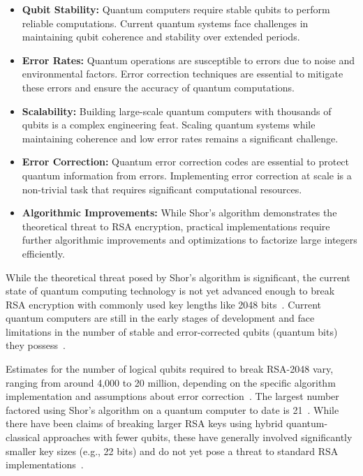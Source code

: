 \documentclass[12pt,a4paper]{report}
\begin{document}
\begin{itemize}
    \item \textbf{Qubit Stability:} Quantum computers require stable qubits to perform reliable computations. Current quantum systems face challenges in maintaining qubit coherence and stability over extended periods.
    \item \textbf{Error Rates:} Quantum operations are susceptible to errors due to noise and environmental factors. Error correction techniques are essential to mitigate these errors and ensure the accuracy of quantum computations.
    \item \textbf{Scalability:} Building large-scale quantum computers with thousands of qubits is a complex engineering feat. Scaling quantum systems while maintaining coherence and low error rates remains a significant challenge.
    \item \textbf{Error Correction:} Quantum error correction codes are essential to protect quantum information from errors. Implementing error correction at scale is a non-trivial task that requires significant computational resources.
    \item \textbf{Algorithmic Improvements:} While Shor's algorithm demonstrates the theoretical threat to RSA encryption, practical implementations require further algorithmic improvements and optimizations to factorize large integers efficiently.
\end{itemize}

While the theoretical threat posed by Shor's algorithm is significant, the current state of quantum computing technology is not yet advanced enough to break RSA encryption with commonly used key lengths like 2048 bits~\cite{SpinQShor}. Current quantum computers are still in the early stages of development and face limitations in the number of stable and error-corrected qubits (quantum bits) they possess~\cite{CatoNetworks}.

Estimates for the number of logical qubits required to break RSA-2048 vary, ranging from around 4,000 to 20 million, depending on the specific algorithm implementation and assumptions about error correction~\cite{BTQHowFar}. The largest number factored using Shor's algorithm on a quantum computer to date is 21~\cite{SpinQShor}. While there have been claims of breaking larger RSA keys using hybrid quantum-classical approaches with fewer qubits, these have generally involved significantly smaller key sizes (e.g., 22 bits) and do not yet pose a threat to standard RSA implementations~\cite{FreemindtronicRSA}.
\end{document}
